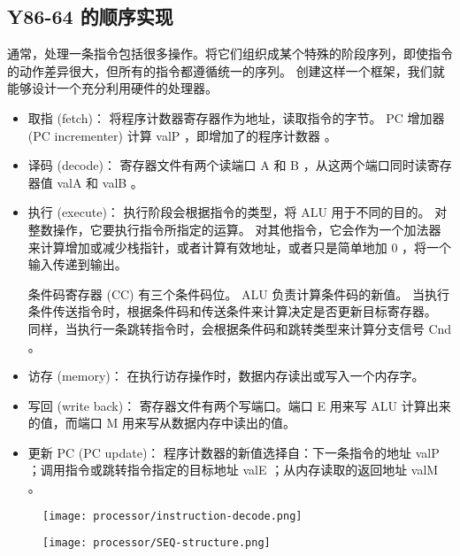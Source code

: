 \subsection{Y86-64 的顺序实现}

通常，处理一条指令包括很多操作。将它们组织成某个特殊的阶段序列，即使指令的动作差异很大，但所有的指令都遵循统一的序列。
创建这样一个框架，我们就能够设计一个充分利用硬件的处理器。
\begin{itemize}
    \item 取指 (fetch)：
          将程序计数器寄存器作为地址，读取指令的字节。 PC 增加器 (PC incrementer) 计算 valP ，即增加了的程序计数器 。
    \item 译码 (decode)：
          寄存器文件有两个读端口 A 和 B ，从这两个端口同时读寄存器值 valA 和 valB 。
    \item 执行 (execute)：
          执行阶段会根据指令的类型，将 ALU 用于不同的目的。
          对整数操作，它要执行指令所指定的运算。
          对其他指令，它会作为一个加法器来计算增加或减少栈指针，或者计算有效地址，或者只是简单地加 0 ，将一个输入传递到输出。

          条件码寄存器 (CC) 有三个条件码位。 ALU 负责计算条件码的新值。
          当执行条件传送指令时，根据条件码和传送条件来计算决定是否更新目标寄存器。
          同样，当执行一条跳转指令时，会根据条件码和跳转类型来计算分支信号 Cnd 。
    \item 访存 (memory)：
          在执行访存操作时，数据内存读出或写入一个内存字。
    \item 写回 (write back)：
          寄存器文件有两个写端口。端口 E 用来写 ALU 计算出来的值，而端口 M 用来写从数据内存中读出的值。
    \item 更新 PC (PC update)：
          程序计数器的新值选择自：下一条指令的地址 valP ；调用指令或跳转指令指定的目标地址 valE ；从内存读取的返回地址 valM 。
\end{itemize}
\begin{figure}[H]
    \centering
    \texttt{[image: processor/instruction-decode.png]}
\end{figure}
\begin{figure}[H]
    \centering
    \texttt{[image: processor/SEQ-structure.png]}
\end{figure}
